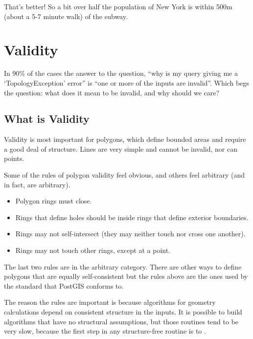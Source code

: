 \documentclass[a4paper,11pt,english]{sphinxmanual}
\begin{document}
That’s better! So a bit over half the population of New York is within 500m (about a 5-7 minute walk) of the subway.


\section{Validity}
\label{\detokenize{advanced:validity}}\label{\detokenize{advanced:id2}}
In 90\% of the cases the answer to the question, “why is my query giving me a ‘TopologyException’ error” is “one or more of the inputs are invalid”.  Which begs the question: what does it mean to be invalid, and why should we care?


\subsection{What is Validity}
\label{\detokenize{advanced:what-is-validity}}
Validity is most important for polygons, which define bounded areas and require a good deal of structure. Lines are very simple and cannot be invalid, nor can points.

Some of the rules of polygon validity feel obvious, and others feel arbitrary (and in fact, are arbitrary).
\begin{itemize}
\item {} 
Polygon rings must close.

\item {} 
Rings that define holes should be inside rings that define exterior boundaries.

\item {} 
Rings may not self-intersect (they may neither touch nor cross one another).

\item {} 
Rings may not touch other rings, except at a point.

\end{itemize}

The last two rules are in the arbitrary category. There are other ways to define polygons that are equally self-consistent but the rules above are the ones used by the {\hyperref[\detokenize{glossary:term-ogc}]{}} {\hyperref[\detokenize{glossary:term-sfsql}]{}} standard that PostGIS conforms to.

The reason the rules are important is because algorithms for geometry calculations depend on consistent structure in the inputs. It is possible to build algorithms that have no structural assumptions, but those routines tend to be very slow, because the first step in any structure-free routine is to .
\end{document}
